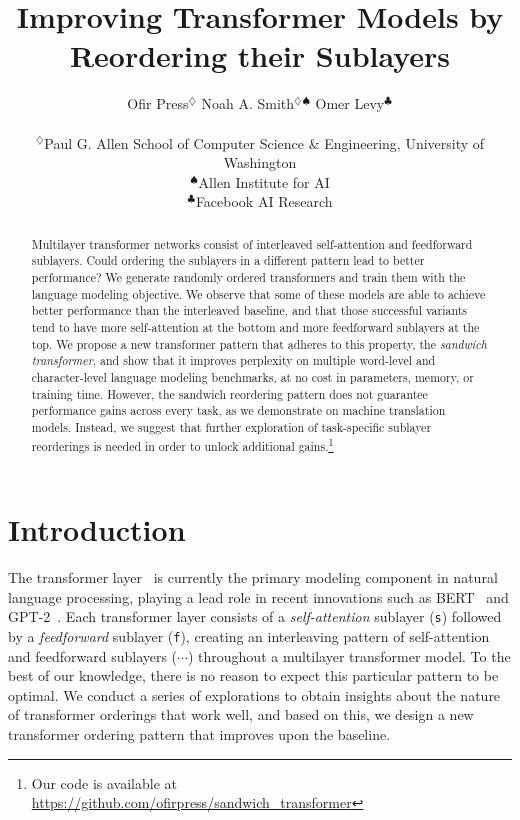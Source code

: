 \documentclass[11pt,a4paper]{article}
\title{Improving Transformer Models by Reordering their Sublayers}
\author{Ofir Press$^\diamondsuit$  \quad Noah A. Smith$^\diamondsuit$$^\spadesuit$ \quad Omer Levy$^\clubsuit$\\
\\ $^\diamondsuit$Paul G. Allen School of Computer Science \& Engineering, University of Washington
\\ $^\spadesuit$Allen Institute for AI
\\ $^\clubsuit$Facebook AI Research
}
\date{}
\begin{document}
\maketitle




\begin{abstract}
Multilayer transformer networks consist of interleaved self-attention and feedforward sublayers.
Could ordering the sublayers in a different pattern lead to better performance?
We generate randomly ordered transformers and train them with the language modeling objective.
We observe that some of these models are able to achieve better performance than the interleaved baseline, and that those successful variants tend to have more self-attention at the bottom and more feedforward sublayers at the top.
We propose a new transformer pattern that adheres to this property, the \textit{sandwich transformer}, and show that it improves perplexity on multiple word-level and character-level language modeling benchmarks, at no cost in parameters, memory, or training time.
However, the sandwich reordering pattern does not guarantee performance gains across every task, as we demonstrate on machine translation models.
Instead, we suggest that further exploration of task-specific sublayer reorderings is needed in order to unlock additional gains.\footnote{Our code is available at \url{https://github.com/ofirpress/sandwich_transformer}} 
\end{abstract} \section{Introduction}



The transformer layer~\citep{AIAYN} is currently the primary modeling component in natural language processing, playing a lead role in recent innovations such as BERT~\citep{BERT} and GPT-2~\citep{gpt-2}.
Each transformer layer consists of a \textit{self-attention} sublayer ({\Large \texttt{\fs s}}) followed by a \textit{feedforward} sublayer  ({\Large \texttt{\fs f}}), creating an interleaving pattern of self-attention and feedforward sublayers ({\Large \texttt{}}\thinspace$\cdots$) throughout a multilayer transformer model.  
To the best of our knowledge, there is no   
reason to expect this particular pattern to be optimal.
We conduct a series of explorations to obtain insights about the nature of transformer orderings that work well, and based on this, we design a new transformer ordering pattern that improves upon the baseline. 
\end{document}

